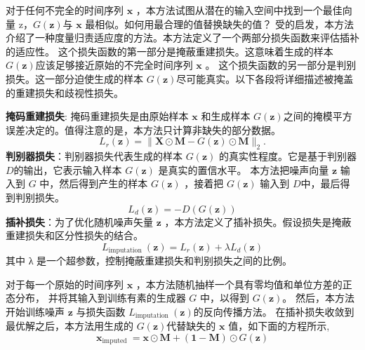 对于任何不完全的时间序列 $\boldsymbol{x}$ ，本方法试图从潜在的输入空间中找到一个最佳向量 z，$G(\boldsymbol{z})$与 $\boldsymbol{x}$ 
最相似。如何用最合理的值替换缺失的值？
受\cite{gan}的启发，本方法介绍了一种度量归责适应度的方法。本方法定义了一个两部分损失函数来评估插补的适应性。
这个损失函数的第一部分是掩蔽重建损失。这意味着生成的样本 $G(\boldsymbol{z})$应该足够接近原始的不完全时间序列 $\boldsymbol{x}$ 。
这个损失函数的另一部分是判别损失。这一部分迫使生成的样本 $G(\boldsymbol{z})$尽可能真实。以下各段将详细描述被掩盖的重建损失和歧视性损失。

\textbf{掩码重建损失}: 掩码重建损失是由原始样本 $\boldsymbol{x}$ 和生成样本 $G(\boldsymbol{z})$之间的掩模平方误差决定的。值得注意的是，本方法只计算非缺失的部分数据。
\begin{equation}
    L_r(\boldsymbol{z})=\|\boldsymbol{X} \odot \boldsymbol{M}-G(\boldsymbol{z}) \odot \boldsymbol{M}\|_2 .
    \end{equation}
\textbf{判别器损失}：判别器损失代表生成的样本 $G(\boldsymbol{z})$ 的真实性程度。它是基于判别器 $D$的输出，它表示输入样本 $G(\boldsymbol{z})$
是真实的置信水平。
本方法把噪声向量 $\boldsymbol{z}$ 输入到 $G$ 中，然后得到产生的样本 $G(\boldsymbol{z})$ ，接着把 $G(\boldsymbol{z})$ 输入到 $D$中，最后得到判别损失。
\begin{equation}
    L_d(\boldsymbol{z})=-D(G(\boldsymbol{z}))
    \end{equation}
\textbf{插补损失}：为了优化随机噪声矢量 $\boldsymbol{z}$ ，本方法定义了插补损失。假设损失是掩蔽重建损失和区分性损失的结合。
\begin{equation}
    L_{\text {imputation }}(\boldsymbol{z})=L_r(\boldsymbol{z})+\lambda L_d(\boldsymbol{z})
    \end{equation}
其中 λ 是一个超参数，控制掩蔽重建损失和判别损失之间的比例。


对于每一个原始的时间序列 $\boldsymbol{x}$ ，本方法随机抽样一个具有零均值和单位方差的正态分布，
并将其输入到训练有素的生成器 $G$ 中，以得到 $G(\boldsymbol{z})$。
然后，本方法开始训练噪声 $\boldsymbol{z}$ 与损失函数 $L_{\text {imputation }}(\boldsymbol{z})$的反向传播方法。
在插补损失收敛到最优解之后，本方法用生成的 $G(\boldsymbol{z})$代替缺失的 $\boldsymbol{x}$ 值，如下面的方程所示,
\begin{equation}
    \boldsymbol{x}_{\text {imputed }}=\boldsymbol{x} \odot \boldsymbol{M}+(\mathbf{1}-\boldsymbol{M}) \odot G(\boldsymbol{z})
    \end{equation}

